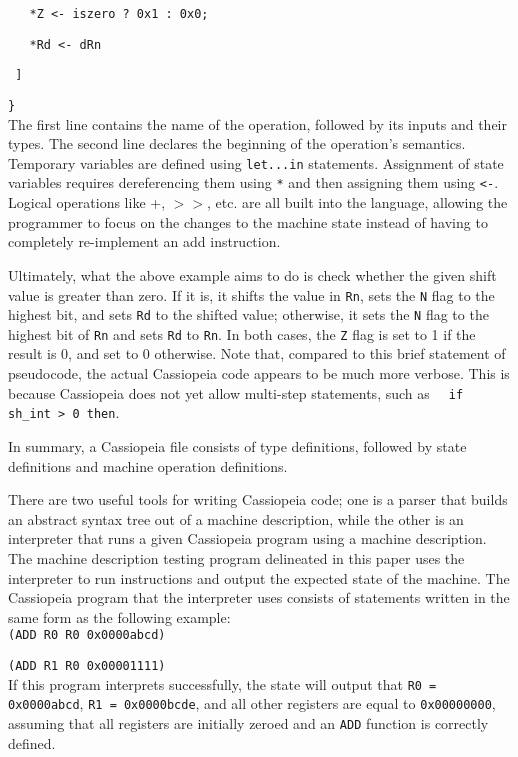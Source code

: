 \documentclass[letterpaper,12pt]{article}
\begin{document}
\texttt{\ \ \ *Z <- iszero ? 0x1 : 0x0;}

\texttt{\ \ \ *Rd <- dRn}

\texttt{\ ]}

\texttt{\}}\\

The first line contains the name of the operation, followed by its inputs and their types. The second line declares the beginning of the operation's semantics. Temporary variables are defined using \texttt{let...in} statements. Assignment of state variables requires dereferencing them using \texttt{*} and then assigning them using \texttt{<-}. Logical operations like +, $>>$, etc. are all built into the language, allowing the programmer to focus on the changes to the machine state instead of having to completely re-implement an add instruction.

Ultimately, what the above example aims to do is check whether the given shift value is greater than zero. If it is, it shifts the value in \texttt{Rn}, sets the \texttt{N} flag to the highest bit, and sets \texttt{Rd} to the shifted value; otherwise, it sets the \texttt{N} flag to the highest bit of \texttt{Rn} and sets \texttt{Rd} to \texttt{Rn}. In both cases, the \texttt{Z} flag is set to 1 if the result is 0, and set to 0 otherwise. Note that, compared to this brief statement of pseudocode, the actual Cassiopeia code appears to be much more verbose. This is because Cassiopeia does not yet allow multi-step statements, such as \texttt{\ \ if sh\_int > 0 then}.

In summary, a Cassiopeia file consists of type definitions, followed by state definitions and machine operation definitions.

There are two useful tools for writing Cassiopeia code; one is a parser that builds an abstract syntax tree out of a machine description, while the other is an interpreter that runs a given Cassiopeia program using a machine description. The machine description testing program delineated in this paper uses the interpreter to run instructions and output the expected state of the machine. The Cassiopeia program that the interpreter uses consists of statements written in the same form as the following example:\\

\texttt{(ADD R0 R0 0x0000abcd)}

\texttt{(ADD R1 R0 0x00001111)}\\

If this program interprets successfully, the state will output that \texttt{R0 = 0x0000abcd}, \texttt{R1 = 0x0000bcde}, and all other registers are equal to \texttt{0x00000000}, assuming that all registers are initially zeroed and an \texttt{ADD} function is correctly defined.
\end{document}
